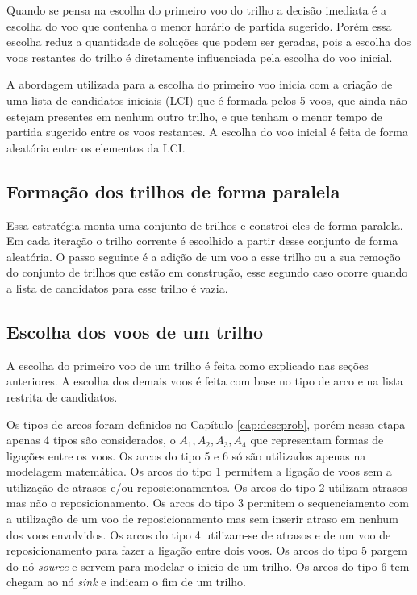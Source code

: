 Quando se pensa na escolha do primeiro voo do trilho a decisão imediata é a escolha do voo que contenha o menor horário de partida sugerido. Porém essa escolha reduz a quantidade de soluções que podem ser geradas, pois a escolha dos voos restantes do trilho é diretamente influenciada pela escolha do voo inicial.

A abordagem utilizada para a escolha do primeiro voo inicia com a criação de uma lista de candidatos iniciais (LCI) que é formada pelos 5 voos, que ainda não estejam presentes em nenhum outro trilho, e que tenham o menor tempo de partida sugerido entre os voos restantes. A escolha do voo inicial é feita de forma aleatória entre os elementos da LCI.


\subsection{Formação dos trilhos de forma paralela}
  
  Essa estratégia monta uma conjunto de trilhos e constroi eles de forma paralela. Em cada iteração o trilho corrente é escolhido a partir desse conjunto de forma aleatória. O passo seguinte é a adição de um voo a esse trilho ou a sua remoção do conjunto de trilhos que estão em construção, esse segundo caso ocorre quando a lista de candidatos para esse trilho é vazia.
  
\subsection{Escolha dos voos de um trilho}

 A escolha do primeiro voo de um trilho é feita como explicado nas seções anteriores. A escolha dos demais voos é feita com base no tipo de arco e na lista restrita de candidatos. 
 
 Os tipos de arcos foram definidos no Capítulo \ref{cap:descprob}, porém nessa etapa apenas 4 tipos são considerados, o   $A_{1},A_{2},A_{3},A_{4}$ que representam formas de ligações entre os voos. Os arcos do tipo 5 e 6 só são utilizados apenas na modelagem matemática. Os arcos do tipo 1 permitem a ligação de voos sem a utilização de atrasos e/ou reposicionamentos. Os arcos do tipo 2 utilizam atrasos mas não o reposicionamento. Os arcos do tipo 3 permitem o sequenciamento com a utilização de um voo de reposicionamento mas sem inserir atraso em nenhum dos voos envolvidos. Os arcos do tipo 4 utilizam-se de atrasos e de um voo de reposicionamento para fazer a ligação entre dois voos. Os arcos do tipo 5 pargem do nó \textit{source} e servem para modelar o inicio de um trilho. Os arcos do tipo 6 tem chegam ao nó \textit{sink} e indicam o fim de um trilho.
 
